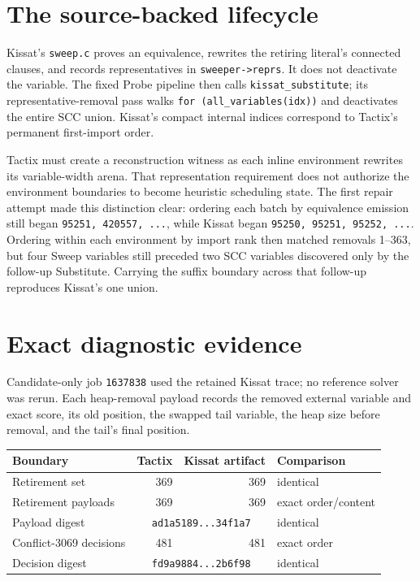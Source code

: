 \documentclass[11pt]{article}
\newcommand{\code}[1]{\texttt{#1}}
\begin{document}
\section*{The source-backed lifecycle}
Kissat's \code{sweep.c} proves an equivalence, rewrites the retiring literal's
connected clauses, and records representatives in \code{sweeper->reprs}.  It
does not deactivate the variable.  The fixed Probe pipeline then calls
\code{kissat\_substitute};
its representative-removal pass walks
\code{for (all\_variables(idx))} and deactivates the entire SCC union.  Kissat's
compact internal indices correspond to Tactix's permanent first-import order.

Tactix must create a reconstruction witness as each inline environment
rewrites its variable-width arena.  That representation requirement does not
authorize the environment boundaries to become heuristic scheduling state.
The first repair attempt made this distinction clear: ordering each batch by
equivalence emission still began \code{95251, 420557, ...}, while Kissat began
\code{95250, 95251, 95252, ...}.  Ordering within each environment by import
rank then matched removals 1--363, but four Sweep variables still preceded two
SCC variables discovered only by the follow-up Substitute.  Carrying the
suffix boundary across that follow-up reproduces Kissat's one union.

\section*{Exact diagnostic evidence}
Candidate-only job \code{1637838} used the retained Kissat trace; no reference
solver was rerun.  Each heap-removal payload records the removed external
variable and exact score, its old position, the swapped tail variable, the
heap size before removal, and the tail's final position.

\begin{center}
\begin{tabular}{lrrl}
\toprule
Boundary & Tactix & Kissat artifact & Comparison \\
\midrule
Retirement set & 369 & 369 & identical \\
Retirement payloads & 369 & 369 & exact order/content \\
Payload digest & \multicolumn{2}{c}{\code{ad1a5189...34f1a7}} & identical \\
Conflict-3069 decisions & 481 & 481 & exact order \\
Decision digest & \multicolumn{2}{c}{\code{fd9a9884...2b6f98}} & identical \\
\bottomrule
\end{tabular}
\end{center}
\end{document}

